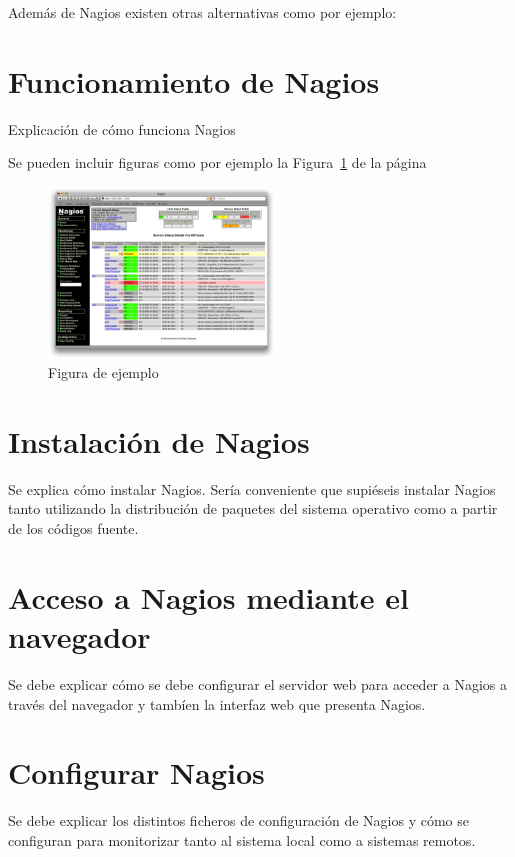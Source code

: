 \documentclass[11pt,a4paper]{article}
\begin{document}
    Además de Nagios existen otras alternativas como por ejemplo: 

    
\section{Funcionamiento de Nagios}

Explicación de cómo funciona Nagios

Se pueden incluir figuras como por ejemplo la Figura~\ref{figura1} de la página \pageref{figura1}

\begin{figure}
\centerline{\includegraphics[width=6cm]{nagios3-1.png}}
\caption{Figura de ejemplo}
\label{figura1}
\end{figure}

\section{Instalación de Nagios}

Se explica cómo instalar Nagios. Sería conveniente que supiéseis instalar Nagios tanto utilizando
la distribución de paquetes del sistema operativo como a partir de los códigos fuente.

\section{Acceso a Nagios mediante el navegador}

Se debe explicar cómo se debe configurar el servidor web para acceder a Nagios a través del navegador
y  tambíen la interfaz web que presenta Nagios.

\section{Configurar Nagios}

Se debe explicar los distintos ficheros de configuración de Nagios y cómo se configuran para 
monitorizar tanto al sistema local como a sistemas remotos.
\end{document}
